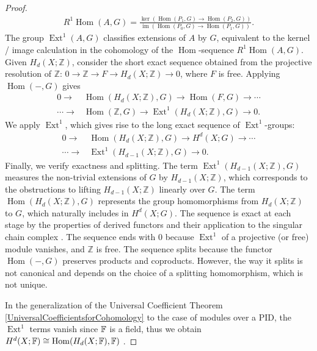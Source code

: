 \begin{proof}
\begin{align}
R^{1} \operatorname{Hom}(A, G) = \frac{\ker(\operatorname{Hom}(P_{1}, G) \to \operatorname{Hom}(P_{2}, G))}{\operatorname{im}(\operatorname{Hom}(P_{0}, G) \to \operatorname{Hom}(P_{1}, G))}.
\end{align}
The group $\operatorname{Ext}^{1}(A, G)$ classifies extensions of $A$ by $G$, equivalent to the kernel / image calculation in the cohomology of the $\operatorname{Hom}$-sequence $R^{1} \operatorname{Hom}(A, G)$. Given $H_{d}(X; \mathbb{Z})$, consider the short exact sequence obtained from the projective resolution of $\mathbb{Z}$: $0 \rightarrow \mathbb{Z} \rightarrow F \rightarrow H_{d}(X; \mathbb{Z}) \rightarrow 0$, where $F$ is free. Applying $\operatorname{Hom}(-, G)$ gives
\begin{align}
0 \rightarrow &\operatorname{Hom}(H_{d}(X; \mathbb{Z}), G) \rightarrow \operatorname{Hom}(F, G) \rightarrow \cdots \nonumber\\
\cdots \rightarrow &\operatorname{Hom}(\mathbb{Z}, G) \rightarrow \operatorname{Ext}^{1}(H_{d}(X; \mathbb{Z}), G) \rightarrow 0.
\end{align}
We apply $\operatorname{Ext}^{1}$, which gives rise to the long exact sequence of $\operatorname{Ext}^1$-groups:
\begin{align}
0 \rightarrow &\operatorname{Hom}(H_{d}(X; \mathbb{Z}), G) \rightarrow H^{d}(X; G) \rightarrow \cdots \nonumber\\
\cdots \rightarrow &\operatorname{Ext}^{1}(H_{d-1}(X; \mathbb{Z}), G) \rightarrow 0.
\end{align}
Finally, we verify exactness and splitting. The term $\operatorname{Ext}^{1}(H_{d-1}(X; \mathbb{Z}), G)$ measures the non-trivial extensions of $G$ by $H_{d-1}(X; \mathbb{Z})$, which corresponds to the obstructions to lifting $H_{d-1}(X; \mathbb{Z})$ linearly over $G$. The term $\operatorname{Hom}(H_{d}(X; \mathbb{Z}), G)$ represents the group homomorphisms from $H_{d}(X; \mathbb{Z})$ to $G$, which naturally includes in $H^{d}(X; G)$. The sequence is exact at each stage by the properties of derived functors and their application to the singular chain complex \cite[Horseshoe Lemma 2.2.8]{Weibel1994}. The sequence ends with $0$ because $\operatorname{Ext}^{1}$ of a projective (or free) module vanishes, and $\mathbb{Z}$ is free. The sequence splits because the functor $\operatorname{Hom}(-, G)$ preserves products and coproducts. However, the way it splits is not canonical and depends on the choice of a splitting homomorphism, which is not unique.

In the generalization of the Universal Coefficient Theorem \ref{UniversalCoefficientsforCohomology} to the case of modules over a PID, the $\operatorname{Ext}^{1}$ terms vanish since ${\mathbb{F}}$ is a field, thus we obtain $H^{d}(X;{\mathbb{F}}) \cong \operatorname{Hom}(H_{d}(X;{\mathbb{F}}),{\mathbb{F}})$ \cite[\S 3.3.1, p.198]{hatcher2005algebraic}.
\end{proof}

